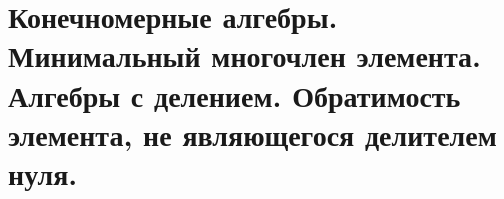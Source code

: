 \section{
    Конечномерные алгебры. Минимальный многочлен элемента. Алгебры с делением. Обратимость элемента, не являющегося делителем нуля.
}





